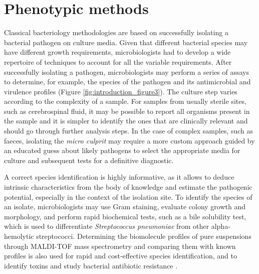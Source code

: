 \section{Phenotypic methods}

Classical bacteriology methodologies are based on successfully isolating a bacterial pathogen on culture media. Given that different bacterial species may have different growth requirements, microbiologists had to develop a wide repertoire of techniques to account for all the variable requirements. After successfully isolating a pathogen, microbiologists may perform a series of assays to determine, for example, the species of the pathogen and its antimicrobial and virulence profiles (Figure \ref{fig:introduction_figure3}). The culture step varies according to the complexity of a sample. For samples from usually sterile sites, such as cerebrospinal fluid, it may be possible to report all organisms present in the sample and it is simpler to identify the ones that are clinically relevant and should go through further analysis steps. In the case of complex samples, such as faeces, isolating the \textit{micro culprit} may require a more custom approach guided by an educated guess about likely pathogens to select the appropriate media for culture and subsequent tests for a definitive diagnostic.

A correct species identification is highly informative, as it allows to deduce intrinsic characteristics from the body of knowledge and estimate the pathogenic potential, especially in the context of the isolation site. To identify the species of an isolate, microbiologists may use Gram staining, evaluate colony growth and morphology, and perform rapid biochemical tests, such as a bile solubility test, which is used to differentiate \textit{Streptococcus pneumoniae} from other alpha-hemolytic streptococci. Determining the biomolecule profiles of pure suspensions through \ac{MALDI-TOF} mass spectrometry and comparing them with known profiles is also used for rapid and cost-effective species identification, and to identify toxins and study bacterial antibiotic resistance \cite{croxatto_applications_2012, lasch_maldi-tof_2025, alizadeh_maldi-tof_2021, seng_ongoing_2009, idelevich_rapid_2018}.

